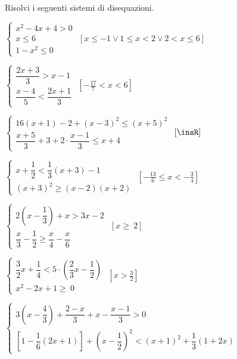 \begin{esercizio}[\Ast]
 \label{ese:21.41}
 Risolvi i seguenti sistemi di disequazioni.
 \begin{enumeratea}
\item \(\left\{\begin{array}{l}x^2-4x+4>0\\x\le 6\\1-x^2\le 0\end{array}\right.\)
 \hfill \(\left[x\le -1\vee 1\le x<2\vee 2<x\le 6\right]\)
\item {\longarray \(\left\{\begin{array}{l}
\dfrac{2x+3}{3}>x-1\\
\dfrac{x-4}{5}<\dfrac{2x+1}{3}
\end{array}\right.\)}
 \hfill \(\left[-{\frac{17}{7}}<x<6\right]\)
\item {\longarray \(\left\{\begin{array}{l}
16(x+1)-2+(x-3)^{2}\le(x+5)^{2}\\
\dfrac{x+5}{3}+3+2\cdot\dfrac{x-1}{3}\le x+4
\end{array}\right.\)}
 \hfill \(\left[\insR\right]\)
\item \(\left\{\begin{array}{l}
x+\dfrac{1}{2}<\dfrac{1}{3}(x+3)-1\\
(x+3)^{2}\ge (x-2)(x+2)
\end{array}\right.\)
 \hfill \(\left[-{\frac{13}{6}}\le x<-{\frac{3}{4}}\right]\)
\item {\longarray \(\left\{\begin{array}{l}
2\left(x-\dfrac{1}{3}\right)+x>3x-2\\
\dfrac{x}{3}-\dfrac{1}{2}\ge \dfrac{x}{4}-\dfrac{x}{6}
  \end{array}\right.\)}
 \hfill \(\left[x\ge~2\right]\)
\item \(\left\{\begin{array}{l}
  \dfrac{3}{2}x+\dfrac{1}{4}<5\cdot\left(\dfrac{2}{3}x-\dfrac{1}{2}\right)\\
  x^2-2x+1\ge~0
\end{array}\right.\)
 \hfill \(\left[x>\frac{3}{2}\right]\)
\item {\longarray \(\left\{\begin{array}{l}
3\left(x-\dfrac{4}{3}\right)+\dfrac{2-x}{3}+x-\dfrac{x-1}{3}>0\\
\left[1-\dfrac{1}{6}(2x+1)\right]+\left(x-\dfrac{1}{2}\right)^{2}<(x+1)^{2}+\dfrac{1}{3}(1+2x)
   \end{array}\right.\)}

\end{enumeratea}
\end{esercizio}
